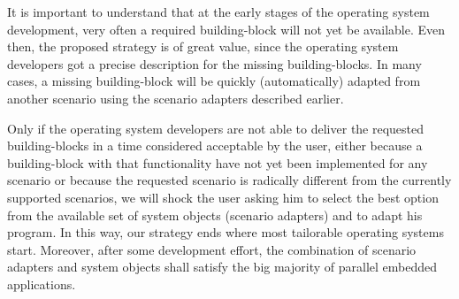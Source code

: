 \documentclass[11pt]{article}
\begin{document}
	 It is important to understand that at the early stages of the operating system development, very often a required building-block will not yet be available. Even then, the proposed strategy is of great value, since the operating system developers got a precise description for the missing building-blocks. In many cases, a missing building-block will be quickly (automatically) adapted from another scenario using the scenario adapters described earlier.

	Only if the operating system developers are not able to deliver the requested building-blocks in a time considered acceptable by the user, either because a building-block with that functionality have not yet been implemented for any scenario or because the requested scenario is radically different from the currently supported scenarios, we will shock the user asking him to select the best option from the available set of system objects (scenario adapters) and to adapt his program. In this way, our strategy ends where most tailorable operating systems start. Moreover, after some development effort, the combination of scenario adapters and system objects shall satisfy the big majority of parallel embedded applications.



 
\end{document}
